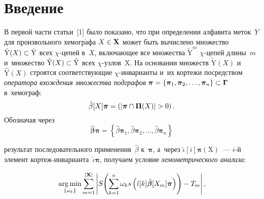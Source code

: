 
  



\thispagestyle{headings}

\begin{multicols}{2}

\label{st\stat}

\section{Введение}

     В первой части статьи~[1] было показано, что при определении алфавита 
меток~$Y$ для произвольного хемогр$\acute{\mbox{а}}$фа ${X}\hm\in \mathbf{X}$ может 
быть вычислено множество $\tilde{\mathrm{Y}}({X})\hm\subset \tilde{\mathrm{Y}}$ 
всех $\chi$-це\-пей в~$X$, включающее все множества $\tilde{\mathrm{Y}}^m$ 
$\chi$-це\-пей длины~$m$ и~множество 
$\hat{\mathrm{Y}}({X})\hm\subset \hat{\mathrm{Y}}$ всех  
$\chi$-уз\-лов~X. На основании множеств $\tilde{\mathrm{Y}}({X})$ 
и~$\hat{\mathrm{Y}}({X})$ строятся соответствующие $\chi$-ин\-ва\-ри\-ан\-ты и~их 
кортежи посредством \textit{оператора вхождения множества подграфов} 
$\boldsymbol{\pi}\hm= \{ \bm{\pi}_1,\bm{\pi}_2, \ldots , \bm{\pi}_n\}\hm\subset 
\bm{\Gamma}$ в~хемограф: 
$$
\hat{\beta}[X]\bm{\pi}= \left(\vert \bm{\pi}\cap \bm{\Pi}(X)\vert \hm> 0\right).
$$
 Обозначая через 
 $$
 \hat{\bm{\beta}}\bm{\pi}= \left\{ \hat{\beta}\bm{\pi}_1, \hat{\beta}\bm{\pi}_2, \ldots , \hat{\beta}\bm{\pi}_n\right\}
 $$ 
 
 \vspace*{-2pt}
 
 \noindent
результат последовательного применения~$\hat{\beta}$ к~$\bm{\pi}$, а~через 
$\hat{\iota}[i]\bm{\pi}(\mathrm{X})$~--- $i$-й элемент  
кор\-теж-ин\-ва\-ри\-ан\-та~$\hat{\iota}\bm{\pi}$, получаем условие 
\textit{хе\-мо\-мет\-ри\-че\-ско\-го анализа}:

\noindent
     \begin{equation}
     \mathop{\mathrm{arg}\,\mathrm{min}}\limits_{\{\omega_k\}} \sum\limits_{m=1}^{\vert \mathbf{X}\vert} 
\left\vert S \!\left( \sum\limits^n_{k=1} \omega_k s \left( 
\hat{\iota}[k]\hat{\bm{\beta}}[X_m]\bm{\pi}\right)\right)- T_m\right\vert,\!
     \label{e1-tor}
     \end{equation}
     

\end{multicols}
